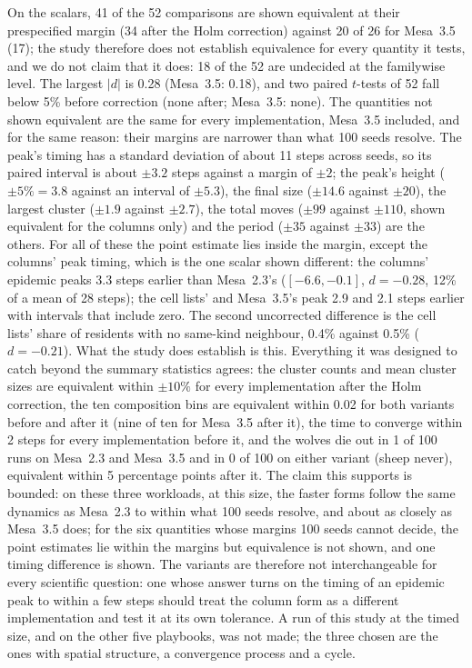 On the scalars, 41 of the 52 \modelly{} comparisons are shown equivalent at their
prespecified margin (34 after the Holm correction) against 20 of 26 for Mesa~3.5 (17); the
study therefore does not establish equivalence for every quantity it tests, and we do not
claim that it does: 18 of the 52 are undecided at the familywise level. The
largest $|d|$ is 0.28 (Mesa~3.5: 0.18), and two paired $t$-tests of 52 fall below 5\% before
correction (none after; Mesa~3.5: none). The quantities not shown equivalent are the same
for every implementation, Mesa~3.5 included, and for the same reason: their margins are
narrower than what 100 seeds resolve. The peak's timing has a standard deviation of about
11 steps across seeds, so its paired interval is about $\pm 3.2$ steps against a margin of
$\pm 2$; the peak's height ($\pm 5\% = 3.8$ against an interval of $\pm 5.3$), the final
size ($\pm 14.6$ against $\pm 20$), the largest cluster ($\pm 1.9$ against $\pm 2.7$), the
total moves ($\pm 99$ against $\pm 110$, shown equivalent for the columns only) and the
period ($\pm 35$ against $\pm 33$) are the others. For all of these the point estimate lies
inside the margin, except the columns' peak timing, which is the one scalar shown different:
the columns' epidemic peaks $3.3$ steps earlier than Mesa~2.3's ($[-6.6, -0.1]$, $d =
-0.28$, 12\% of a mean of 28 steps); the cell lists' and Mesa~3.5's peak 2.9 and 2.1 steps
earlier with intervals that include zero. The second uncorrected difference is the cell
lists' share of residents with no same-kind neighbour, 0.4\% against 0.5\% ($d = -0.21$).
What the study does establish is this. Everything it was designed to catch beyond the
summary statistics agrees: the
cluster counts and mean cluster sizes are equivalent within $\pm 10\%$ for every
implementation after the Holm correction, the ten composition bins are equivalent within
0.02 for both \modelly{} variants before and after it (nine of ten for Mesa~3.5 after it),
the time to converge within 2 steps for every implementation before it, and the wolves die
out in 1 of 100 runs on Mesa~2.3 and Mesa~3.5 and in 0 of 100 on either \modelly{} variant
(sheep never), equivalent within 5 percentage points after it. The claim this supports
is bounded: on these three workloads, at this size, the faster forms follow the same
dynamics as Mesa~2.3 to within what 100 seeds resolve, and about as closely as Mesa~3.5 does;
for the six quantities whose margins 100 seeds cannot decide, the point estimates lie
within the margins but equivalence is not shown, and one timing difference is shown. The
variants are therefore not interchangeable for every scientific question: one whose answer
turns on the timing of an epidemic peak to within a few steps should treat the column form
as a different implementation and test it at its own tolerance. A run of this study at
the timed size, and on the other five playbooks, was not made; the three
chosen are the ones with spatial structure, a convergence process and a cycle.
